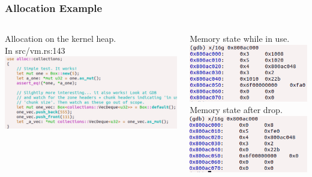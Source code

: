 \documentclass{beamer}
\begin{document}
\begin{frame}[fragile]
  \frametitle{Allocation Example}
  \begin{columns}
    \begin{column}{0.5\textwidth}
        Allocation on the kernel heap.\\[5pt]
        In src/vm.rs:143
      \includegraphics[height=0.45\textwidth]{test_galloc.png}
    \end{column}
    \begin{column}{0.5\textwidth}
      Memory state while in use.
      \includegraphics[width=\textwidth]{alloc_vmalloc.png}\\
      Memory state after drop.
      \includegraphics[width=\textwidth]{free_vmalloc.png}
    \end{column}
  \end{columns}
\end{frame}
\end{document}
